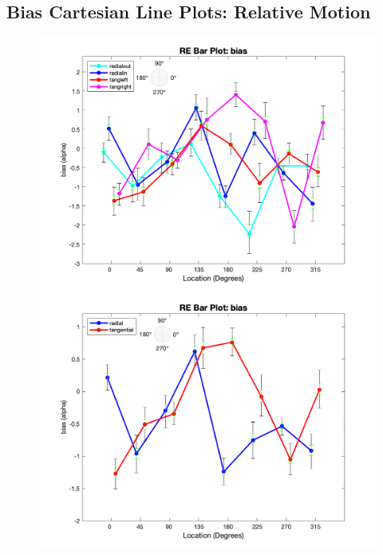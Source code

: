 \documentclass[11pt]{article} %
\begin{document}
\subsection{Bias Cartesian Line Plots: Relative Motion}
\begin{figure}[H]
\centering %
\includegraphics[scale=.3]{Images/RE_LP_bias_Alldata_4conds.png}
\includegraphics[scale=.3]{Images/RE_LP_bias_Alldata_2conds.png}
\end{figure}
\end{document}
